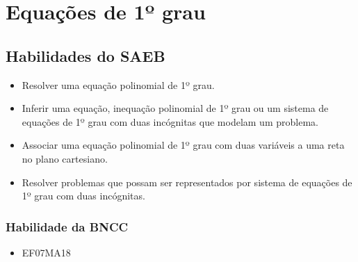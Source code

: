 
\chapter{Equações de 1º grau}

\section*{Habilidades do SAEB }
\begin{itemize}
\item Resolver uma equação polinomial de 1º grau.
\item
  Inferir uma equação, inequação polinomial de 1º grau ou um sistema de
  equações de 1º grau com duas incógnitas que modelam um problema.
\item
  Associar uma equação polinomial de 1º grau com duas variáveis a uma
  reta no plano cartesiano.
\item
  Resolver problemas que possam ser representados por sistema de
  equações de 1º grau com duas incógnitas.
\end{itemize}

\subsection{Habilidade da BNCC}
\begin{itemize}
\item EF07MA18
\end{itemize}



